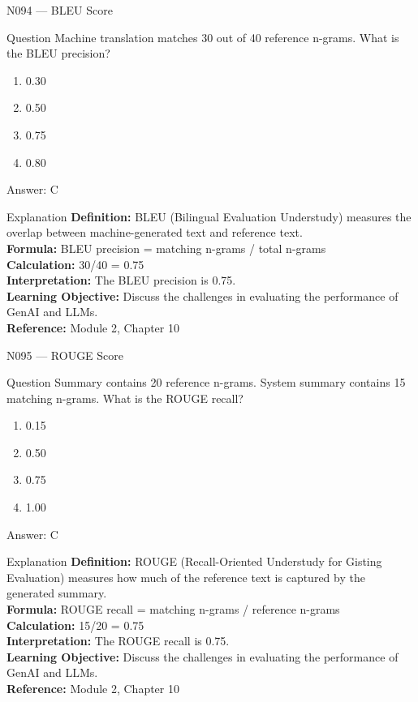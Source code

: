 \documentclass[aspectratio=169,8pt]{beamer}
\begin{document}
	\begin{frame}{N094 --- BLEU Score}
		\begin{block}{Question}
			Machine translation matches 30 out of 40 reference n-grams. What is the BLEU precision?
			\begin{enumerate}
				\item 0.30
				\item 0.50
				\item 0.75
				\item 0.80
			\end{enumerate}
		\end{block}
		\begin{exampleblock}{Answer: C}\end{exampleblock}
		\begin{block}{Explanation}
			\textbf{Definition:} BLEU (Bilingual Evaluation Understudy) measures the overlap between machine-generated text and reference text.\\
			\textbf{Formula:} BLEU precision = matching n-grams / total n-grams\\
			\textbf{Calculation:} 30/40 = 0.75\\
			\textbf{Interpretation:} The BLEU precision is 0.75.\\
			\textbf{Learning Objective:} Discuss the challenges in evaluating the performance of GenAI and LLMs.\\
			\textbf{Reference:} Module 2, Chapter 10
		\end{block}
	\end{frame}
	
	\begin{frame}{N095 --- ROUGE Score}
		\begin{block}{Question}
			Summary contains 20 reference n-grams. System summary contains 15 matching n-grams. What is the ROUGE recall?
			\begin{enumerate}
				\item 0.15
				\item 0.50
				\item 0.75
				\item 1.00
			\end{enumerate}
		\end{block}
		\begin{exampleblock}{Answer: C}\end{exampleblock}
		\begin{block}{Explanation}
			\textbf{Definition:} ROUGE (Recall-Oriented Understudy for Gisting Evaluation) measures how much of the reference text is captured by the generated summary.\\
			\textbf{Formula:} ROUGE recall = matching n-grams / reference n-grams\\
			\textbf{Calculation:} 15/20 = 0.75\\
			\textbf{Interpretation:} The ROUGE recall is 0.75.\\
			\textbf{Learning Objective:} Discuss the challenges in evaluating the performance of GenAI and LLMs.\\
			\textbf{Reference:} Module 2, Chapter 10
		\end{block}
	\end{frame}
	
\end{document}
